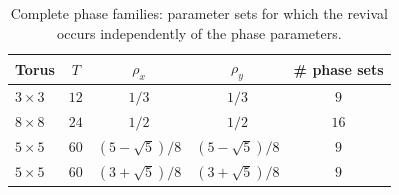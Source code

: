 \begin{table}[htbp]
\centering
\caption{Complete phase families: parameter sets for which the revival
occurs independently of the phase parameters.}
\label{tab:complete-phase}
\begin{tabular}{lcccc}
\toprule
Torus & $T$ & $\rho_x$ & $\rho_y$ & \# phase sets \\
\midrule
$3\times3$ & $12$ & $1/3$ & $1/3$ & $9$ \\
$8\times8$ & $24$ & $1/2$ & $1/2$ & $16$ \\
$5\times5$ & $60$ & $(5-\sqrt{5})/8$ & $(5-\sqrt{5})/8$ & $9$ \\
$5\times5$ & $60$ & $(3+\sqrt{5})/8$ & $(3+\sqrt{5})/8$ & $9$ \\
\bottomrule
\end{tabular}
\end{table}
